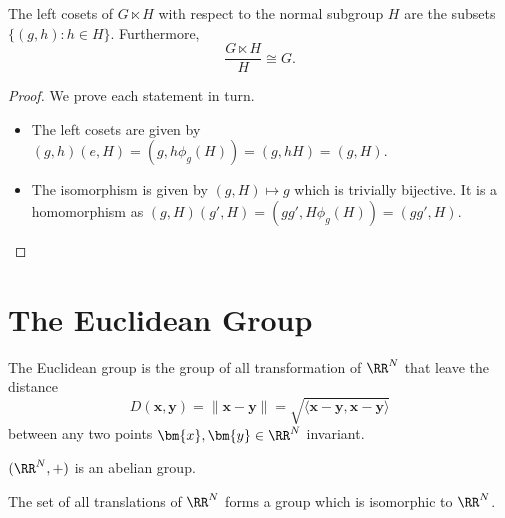 \documentclass[12pt, a4paper]{article}
\begin{document}
\begin{mdthm}
    The left cosets of \(G \ltimes H\) with respect to the normal subgroup \(H\) are the subsets \(\{(g,h) : h \in H\}\). Furthermore,
    \[\frac{G \ltimes H}{H} \cong G.\]
\end{mdthm}

\begin{proof}
    We prove each statement in turn.
    \begin{itemize}
        \item The left cosets are given by \((g,h)(e,H)=(g,h\phi_g(H))=(g,hH)=(g,H)\).
        \item The isomorphism is given by \((g,H) \mapsto g\) which is trivially bijective. It is a homomorphism as \((g,H)(g',H)=(gg',H\phi_g(H))=(gg',H)\).
    \end{itemize}
\end{proof}

\pagebreak

\section{The Euclidean Group}

The Euclidean group is the group of all transformation of \(\RR^N\) that leave the distance
\[D(\bm{x},\bm{y})=\|\bm{x}-\bm{y}\| =\sqrt{\langle \bm{x}-\bm{y}, \bm{x}-\bm{y} \rangle}\]
between any two points \(\bm{x},\bm{y} \in \RR^N\) invariant. 

\begin{proposition}
    \((\RR^N,+)\) is an abelian group.
\end{proposition}

\begin{mdthm}
    The set of all translations of \(\RR^N\) forms a group which is isomorphic to \(\RR^N\).
\end{mdthm}
\end{document}
